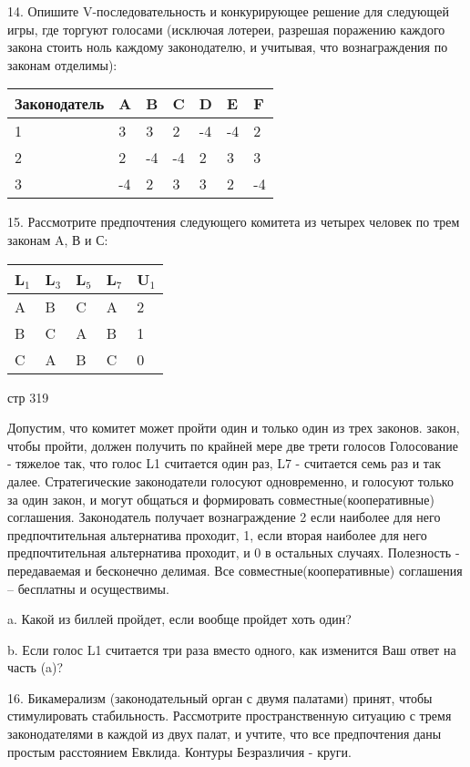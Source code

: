 \documentclass[a4paper,12pt]{article}
\begin{document}
14. Опишите V-последовательность и конкурирующее
решение для следующей игры, где торгуют голосами
(исключая лотереи, разрешая поражению каждого
закона стоить ноль каждому законодателю, и
учитывая, что вознаграждения по законам отделимы):

\begin{tabular}{|l|l|l|l|l|l|l|}
\hline Законодатель & A & B & C & D & E & F \\
\hline
1 & 3 & 3 & 2 & -4 & -4 & 2 \\ 2 & 2 & -4 & -4 & 2 & 3 & 3 \\
3 & -4 & 2 & 3 & 3 & 2 & -4 \\ \hline
\end{tabular}

15. Рассмотрите предпочтения следующего комитета из
четырех человек по трем законам A, В и С:

\begin{tabular}{|l|l|l|l|l|}
\hline L$_{1}$ & L$_{3}$ & L$_{5}$ & L$_{7}$ &
U$_{1}$ \\ \hline A & B & C & A & 2 \\ B & C & A &
B & 1 \\ C & A & B & C & 0 \\ \hline
\end{tabular}

стр 319

Допустим, что комитет может пройти один и только
один из трех законов. закон, чтобы пройти, должен
получить по крайней мере две трети голосов
Голосование - тяжелое так, что голос L1 считается
один раз, L7 - считается семь раз и так далее.
Стратегические законодатели голосуют одновременно,
и голосуют только за один закон, и могут общаться и
формировать совместные(кооперативные) соглашения.
Законодатель получает вознаграждение 2 если
наиболее для него предпочтительная альтернатива
проходит, 1, если вторая наиболее для него
предпочтительная альтернатива проходит, и 0 в
остальных случаях. Полезность - передаваемая и
бесконечно делимая. Все совместные(кооперативные)
соглашения -- бесплатны и осуществимы.

a. Какой из биллей пройдет, если вообще пройдет
хоть один?

b. Если голос L1 считается три раза вместо одного,
как изменится Ваш ответ на часть (a)?

16. Бикамерализм (законодательный орган с двумя
палатами) принят, чтобы стимулировать стабильность.
Рассмотрите пространственную ситуацию с тремя
законодателями в каждой из двух палат, и учтите,
что все предпочтения даны простым расстоянием
Евклида. Контуры Безразличия - круги.
\end{document}
